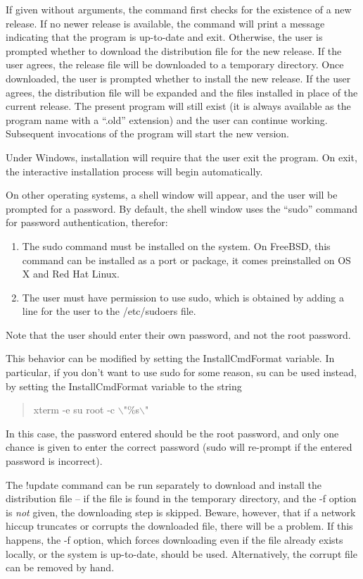 If given without arguments, the command first checks for the existence
of a new release.  If no newer release is available, the command will
print a message indicating that the program is up-to-date and exit. 
Otherwise, the user is prompted whether to download the distribution
file for the new release.  If the user agrees, the release file will
be downloaded to a temporary directory.  Once downloaded, the user is
prompted whether to install the new release.  If the user agrees, the
distribution file will be expanded and the files installed in place of
the current release.  The present program will still exist (it is
always available as the program name with a ``{\vt .old}'' extension)
and the user can continue working.  Subsequent invocations of the
program will start the new version.

Under Windows, installation will require that the user exit the
program.  On exit, the interactive installation process will begin
automatically.

On other operating systems, a shell window will appear, and the user
will be prompted for a password.  By default, the shell window uses
the ``{\vt sudo}'' command for password authentication, therefor:
\begin{enumerate}
\item{The {\vt sudo} command must be installed on the system.
On FreeBSD, this command can be installed as a port or package, it
comes preinstalled on OS X and Red Hat Linux.}
\item{The user must have permission to use {\vt sudo}, which is
obtained by adding a line for the user to the {\vt /etc/sudoers} file.}
\end{enumerate}
Note that the user should enter their own password, and not the
root password.

This behavior can be modified by setting the {\et InstallCmdFormat}
variable.  In particular, if you don't want to use {\vt sudo} for some
reason, {\vt su} can be used instead, by setting the {\et
InstallCmdFormat} variable to the string
\begin{quote}
\vt xterm -e su root -c $\backslash$"\%s$\backslash$"
\end{quote}
In this case, the password entered should be the root password, and
only one chance is given to enter the correct password ({\vt sudo}
will re-prompt if the entered password is incorrect).

The {\cb !update} command can be run separately to download and
install the distribution file -- if the file is found in the temporary
directory, and the {\vt -f} option is {\it not} given, the downloading
step is skipped.  Beware, however, that if a network hiccup truncates
or corrupts the downloaded file, there will be a problem.  If this
happens, the {\vt -f} option, which forces downloading even if the file
already exists locally, or the system is up-to-date, should be used. 
Alternatively, the corrupt file can be removed by hand.

